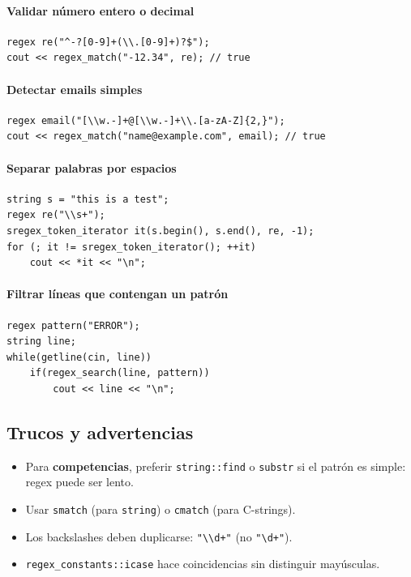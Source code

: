 \documentclass{article}
\begin{document}
\paragraph{Validar número entero o decimal}
\begin{lstlisting}[style=cppstyle]
regex re("^-?[0-9]+(\\.[0-9]+)?$");
cout << regex_match("-12.34", re); // true
\end{lstlisting}

\paragraph{Detectar emails simples}
\begin{lstlisting}[style=cppstyle]
regex email("[\\w.-]+@[\\w.-]+\\.[a-zA-Z]{2,}");
cout << regex_match("name@example.com", email); // true
\end{lstlisting}

\paragraph{Separar palabras por espacios}
\begin{lstlisting}[style=cppstyle]
string s = "this is a test";
regex re("\\s+");
sregex_token_iterator it(s.begin(), s.end(), re, -1);
for (; it != sregex_token_iterator(); ++it)
    cout << *it << "\n";
\end{lstlisting}

\paragraph{Filtrar líneas que contengan un patrón}
\begin{lstlisting}[style=cppstyle]
regex pattern("ERROR");
string line;
while(getline(cin, line))
    if(regex_search(line, pattern))
        cout << line << "\n";
\end{lstlisting}

\subsection{Trucos y advertencias}

\begin{itemize}
  \item Para \textbf{competencias}, preferir \lstinline|string::find| o \lstinline|substr| si el patrón es simple: regex puede ser lento.
  \item Usar \lstinline|smatch| (para \lstinline|string|) o \lstinline|cmatch| (para C-strings).
  \item Los backslashes deben duplicarse: \lstinline|"\\d+"| (no \lstinline|"\d+"|).
  \item \lstinline|regex_constants::icase| hace coincidencias sin distinguir mayúsculas.
\end{itemize}
\end{document}
